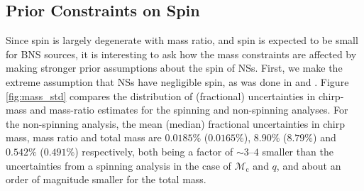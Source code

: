 \subsection{Prior Constraints on Spin}
\label{subsec:prior_constraints}

Since spin is largely degenerate with mass ratio, and spin is expected to be small for BNS sources, it is interesting to ask how the mass constraints are affected by making stronger prior assumptions about the spin of NSs.  First, we make the extreme assumption that NSs have negligible spin, as was done in \citet{Singer_2014} and \citet{Berry_2014}.  Figure \ref{fig:mass_std} compares the distribution of (fractional) uncertainties in chirp-mass and mass-ratio estimates for the spinning and non-spinning analyses. For the non-spinning analysis, the mean (median) fractional uncertainties in chirp mass, mass ratio and total mass are $0.0185\%$ ($0.0165\%$), $8.90\%$ ($8.79\%$) and $0.542\%$ ($0.491\%$) respectively, both being a factor of $\sim3$--$4$ smaller than the uncertainties from a spinning analysis in the case of $\mathcal{M}_\mathrm{c}$ and $q$, and about an order of magnitude smaller for the total mass.
  
  
  
  
  
  
  
  
  
  
  
  